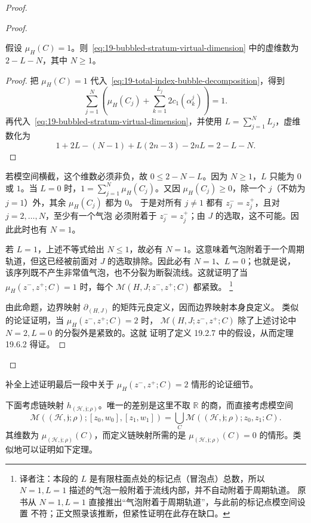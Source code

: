 \begin{proof}
\begin{proof}
\begin{lemma}
\label{lem:index-one-bubbled-stratum-dimension}
假设 $\mu_H(C)=1$。则~\eqref{eq:19-bubbled-stratum-virtual-dimension} 中的虚维数为
$2-L-N$，其中 $N\geq1$。
\end{lemma}

\begin{proof}
把 $\mu_H(C)=1$ 代入~\eqref{eq:19-total-index-bubble-decomposition}，得到
\[
 \sum_{j=1}^{N}
 \left(\mu_H(C_j)+\sum_{k=1}^{L_j}2c_1(\alpha_k^j)\right)=1.
\]
再代入~\eqref{eq:19-bubbled-stratum-virtual-dimension}，并使用
$L=\sum_{j=1}^{N}L_j$，虚维数化为
\[
 1+2L-(N-1)+L(2n-3)-2nL=2-L-N.
\]
\end{proof}

若模空间横截，这个维数必须非负，故 $0\leq2-N-L$。因为 $N\geq1$，$L$ 只能为
$0$ 或 $1$。当 $L=0$ 时，$1=\sum_{j=1}^{N}\mu_H(C_j)$。又因
$\mu_H(C_j)\geq0$，除一个 $j$（不妨为 $j=1$）外，其余 $\mu_H(C_j)$ 都为 $0$。
于是对所有 $j\neq1$ 都有 $z_j^-=z_j^+$，且对 $j=2,\ldots,N$，至少有一个气泡
必须附着于 $z_j^-=z_j^+$；由 $J$ 的选取，这不可能。因此此时也有 $N=1$。

若 $L=1$，上述不等式给出 $N\leq1$，故必有 $N=1$。这意味着气泡附着于一个周期
轨道，但这已经被前面对 $J$ 的选取排除。因此必有 $N=1$、$L=0$；也就是说，
该序列既不产生非常值气泡，也不分裂为断裂流线。这就证明了当
$\mu_H(z^-,z^+;C)=1$ 时，每个 $\mathcal M(H,J;z^-,z^+;C)$ 都紧致。
\footnote{译者注：本段的 $L$ 是有限柱面点处的标记点（冒泡点）总数，所以
$N=1,L=1$ 描述的气泡一般附着于\personFloer{}流线内部，并不自动附着于周期轨道。
原书从 $N=1,L=1$ 直接推出“气泡附着于周期轨道”，与此前的标记点模空间设置
不符；正文照录该推断，但紧性证明在此存在缺口。}

由此命题，边界映射 $\partial_{(H,J)}$ 的矩阵元良定义，因而边界映射本身良定义。
类似的论证证明，当 $\mu_H(z^-,z^+;C)=2$ 时，
$\mathcal M(H,J;z^-,z^+;C)$ 除了上述讨论中 $N=2,L=0$ 的分裂外是紧致的。这就
证明了定义 19.2.7 中的假设，从而定理 19.6.2 得证。
\end{proof}
\end{proof}

\begin{exercise}
\label{ex:index-two-boundary-compactification-details}
补全上述证明最后一段中关于 $\mu_H(z^-,z^+;C)=2$ 情形的论证细节。
\end{exercise}

下面考虑链映射 $h_{(\mathcal H,\mathfrak j;\rho)}$。唯一的差别是这里不取
$\mathbb R$ 的商，而直接考虑模空间
\[
 \mathcal M((\mathcal H,\mathfrak j;\rho);[z_0,w_0],[z_1,w_1])
 =\bigcup_C\mathcal M((\mathcal H,\mathfrak j;\rho);z_0,z_1;C).
\]
其维数为 $\mu_{(\mathcal H,\mathfrak j;\rho)}(C)$，而定义链映射所需的是
$\mu_{(\mathcal H,\mathfrak j;\rho)}(C)=0$ 的情形。类似地可以证明如下定理。

